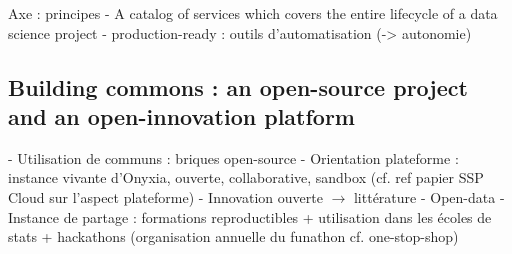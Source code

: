 Axe : principes
- A catalog of services which covers the entire lifecycle of a data science project
- production-ready : outils d'automatisation (-> autonomie)

\subsection{Building commons : an open-source project and an open-innovation platform}

- Utilisation de communs : briques open-source
- Orientation plateforme : instance vivante d'Onyxia, ouverte, collaborative, sandbox (cf. ref papier SSP Cloud sur l'aspect plateforme)
- Innovation ouverte $\rightarrow$ littérature
- Open-data
- Instance de partage : formations reproductibles + utilisation dans les écoles de stats + hackathons (organisation annuelle du funathon cf. one-stop-shop)
